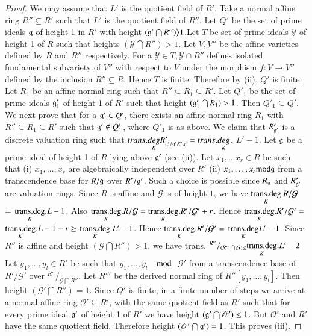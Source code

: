 \begin{enumerate}[(i)]
\begin{proof}
  We may  assume  that $L'$ is the  quotient  field of  $R'$. Take  a
  normal affine ring   $R'' \subseteq R' $  such that $L'$ is the
  quotient field of $R''$. 
    Let $Q'$ be  the set  of prime  ideals $\mathfrak{g}$ of  height  1
  in $R'$ with height \break $(\mathfrak{g}' \bigcap  R'')
  \big>1$.\pageoriginale  Let $T$ be 
  set of prime ideals $\mathscr{Y}$ of height 1 of $R$ such that
  heights $(\mathscr{Y} \bigcap R'') > 1$. Let $V,V''$ be the
  affine  varieties defined by  $R$ and  $R''$ respectively. For  a
  $\mathscr{Y} \in T , \mathscr{Y} \cap R''$ 
  defines isolated fundamental subvariety of $V''$ with respect to $V$
  under the morphism  $f:V \to V''$  defined by the inclusion $R''
  \subseteq R$.  
  Hence $T$ is finite. Therefore by  (ii), $Q'$  is finite. Let
  $R_{1}$  be an affine normal ring  such that  
  $R'' \subseteq R_{1}  \subseteq  R'$. Let  $Q'_{1}$  be  the set of
  prime  ideals  $\mathfrak{g}'_{1}$  of height 1 of $R'$ such  that
  height $(\mathfrak{g}'_{1} \bigcap R_{1})> 1$. Then $Q'_{1} \subseteq Q'$. We
  next prove that for a $\mathfrak{g}' \in Q'$, there exists an 
  affine normal ring  $R_{1}$ with $R''\subseteq R_{1} \subseteq R'$
  such that $\mathfrak{g}' \not\in Q'_{1}$, where  $Q'_{1}$  is as
  above. We claim that $R'_{\mathfrak{g}'}$ is a discrete valuation
  ring such that $trans.\underset{K}{deg}  R'_{\mathfrak{g}' /
    \mathfrak{g}' R' \mathfrak{g}'} = trans. \underset{K}{deg}$. $L'
  -1$. Let $\mathfrak{g}$ be a prime ideal of height 1 of $R$ lying
  above $\mathfrak{g}'$ (see (ii)). Let $x_{1}, \ldots x_{r} \in R$
  be such that (i) $x_{1},\ldots , x_{r}$ are algebraically
  independent over $R'$ (ii) $x_{1},\ldots ,x_{r} {\rm mod} \mathfrak{g}$
  from a transcendence base for $R/\mathfrak{g}$  over $R' /
  \mathfrak{g}'$. Such a choice is possible since $R_{\mathfrak{g}}$
  and $R'_{\mathfrak{g}'}$ are valuation rings. Since $R$ is  affine
  and $\mathcal{G}$ is of height  $1$, we have
  $\underset{K}{\operatorname{trans{.}deg}}.R/ \mathcal{G}$ =
  $\underset{K}{\operatorname{trans{.}deg}}. L-1 $. Also $\underset{K}{\operatorname{trans{.}deg}}. R
  / \mathcal{G} =\underset{K}{\operatorname{trans{.}deg}}. R'/ \mathcal{G}' +
  r$. Hence $\underset{K}{\operatorname{trans{.}deg}}. R'/ \mathcal{G}' =$
  $\underset{K}{\operatorname{trans{.}deg}}. L- 1 - r \ge $
  $\underset{K}{\operatorname{trans{.}deg}}. L' -1$. Hence
  $\underset{K}{\operatorname{trans{.}deg}}. R' / \mathcal{G}' = $
  $\underset{K}{\operatorname{trans{.}deg}} L'-1$.  Since $R''$  is  affine and height
  $(\mathcal{G} \bigcap R'') >1$, we have trans. $^{R''}/ _{(R''
    \bigcap \mathcal{G}) \leq }\underset{K}{\operatorname{trans{.}deg}}. L'- 2 $
  Let $y_{1}, \ldots , y_{l} \in R'$ be such that $y_{1}, \ldots ,
  y_{l}$ $\mod$ $\mathcal{G}'$ from a transcendence  base of  $R'/
  \mathcal{G}'$ over $^{R''}/ _{\mathcal{G} \bigcap R''}$. Let $R'''$
  be the derived  normal ring of $R''[y_{1},\dots , y_{l}]$. Then
  height  $(\mathcal{G}' \bigcap R'')= 1$. Since $Q'$ is\pageoriginale
  finite, in a  finite number of steps we arrive  at a normal affine ring
  $\mathscr{O}' \subseteq R'$, with the same quotient field as $R'$
  such that for every prime  ideal  $\mathfrak{g}'$ of height 1 of $R'$
  we have height $(\mathfrak{g}' \bigcap \mathscr{O}') \le 1$. But
  $\mathscr{O}'$ and $R'$ have the same quotient field. Therefore
  height $(\mathscr{O}' \bigcap \mathfrak{g}') =1$.  
   This proves (iii).
\end{proof}


\end{enumerate}
